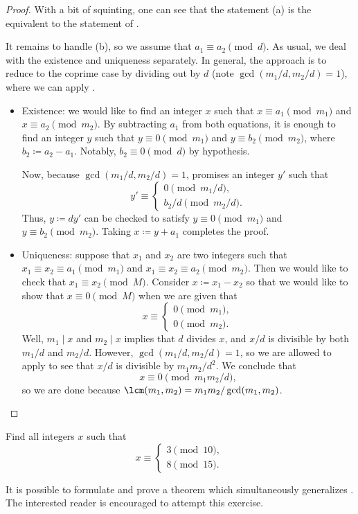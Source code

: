 \documentclass{article}
\begin{document}
\begin{proof}
	With a bit of squinting, one can see that the statement (a) is the equivalent to the statement of .
	
	It remains to handle (b), so we assume that $a_1\equiv a_2\pmod d$. As usual, we deal with the existence and uniqueness separately. In general, the approach is to reduce to the coprime case by dividing out by $d$ (note $\gcd(m_1/d,m_2/d)=1$), where we can apply .
	\begin{itemize}
		\item Existence: we would like to find an integer $x$ such that $x\equiv a_1\pmod{m_1}$ and $x\equiv a_2\pmod{m_2}$. By subtracting $a_1$ from both equations, it is enough to find an integer $y$ such that $y\equiv0\pmod{m_1}$ and $y\equiv b_2\pmod{m_2}$, where $b_2\coloneqq a_2-a_1$. Notably, $b_2\equiv0\pmod d$ by hypothesis.

		Now, because $\gcd(m_1/d,m_2/d)=1$,  promises an integer $y'$ such that
		\[y'\equiv\begin{cases}
			0 \pmod{m_1/d}, \\
			b_2/d \pmod{m_2/d}.
		\end{cases}\]
		Thus, $y\coloneqq dy'$ can be checked to satisfy $y\equiv0\pmod{m_1}$ and $y\equiv b_2\pmod{m_2}$. Taking $x\coloneqq y+a_1$ completes the proof.

		\item Uniqueness: suppose that $x_1$ and $x_2$ are two integers such that $x_1\equiv x_2\equiv a_1\pmod{m_1}$ and $x_1\equiv x_2\equiv a_2\pmod{m_2}$. Then we would like to check that $x_1\equiv x_2\pmod M$. Consider $x\coloneqq x_1-x_2$ so that we would like to show that $x\equiv0\pmod M$ when we are given that
		\[x\equiv\begin{cases}
			0\pmod{m_1}, \\
			0\pmod{m_2}.
		\end{cases}\]
		Well, $m_1\mid x$ and $m_2\mid x$ implies that $d$ divides $x$, and $x/d$ is divisible by both $m_1/d$ and $m_2/d$. However, $\gcd(m_1/d,m_2/d)=1$, so we are allowed to apply  to see that $x/d$ is divisible by $m_1m_2/d^2$. We conclude that
		\[x\equiv0\pmod{m_1m_2/d},\]
		so we are done because $\lcm(m_1,m_2)=m_1m_2/\gcd(m_1,m_2)$.
		\qedhere
	\end{itemize}
\end{proof}
\begin{exe}
	Find all integers $x$ such that
	\[x\equiv\begin{cases}
		3\pmod{10}, \\
		8\pmod{15}.
	\end{cases}\]
\end{exe}
\begin{remark}
	It is possible to formulate and prove a theorem which simultaneously generalizes . The interested reader is encouraged to attempt this exercise.
\end{remark}
\end{document}
